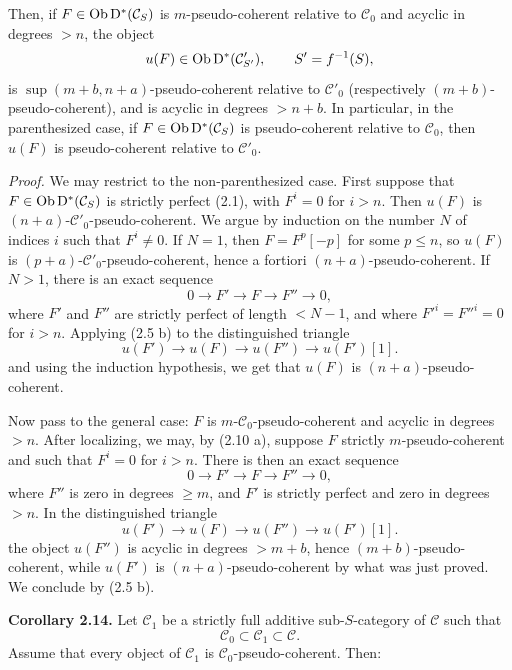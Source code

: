 \documentclass[11pt]{article}
\begin{document}
Then, if \(F\in\operatorname{Ob}\mathrm D^*(\mathcal C_S)\) is \(m\)-pseudo-coherent relative to \(\mathcal C_0\) and acyclic in degrees \(>n\), the object
\[
  u(F)\in\operatorname{Ob}\mathrm D^*(\mathcal C'_{S'}),\qquad S'=f^{-1}(S),
\]
is \(\sup(m+b,n+a)\)-pseudo-coherent relative to \(\mathcal C'_0\) (respectively \((m+b)\)-pseudo-coherent), and is acyclic in degrees \(>n+b\). In particular, in the parenthesized case, if \(F\in\operatorname{Ob}\mathrm D^*(\mathcal C_S)\) is pseudo-coherent relative to \(\mathcal C_0\), then \(u(F)\) is pseudo-coherent relative to \(\mathcal C'_0\).

\emph{Proof.} We may restrict to the non-parenthesized case. First suppose that \(F\in\operatorname{Ob}\mathrm D^*(\mathcal C_S)\) is strictly perfect (2.1), with \(F^i=0\) for \(i>n\). Then \(u(F)\) is \((n+a)\)-\(\mathcal C'_0\)-pseudo-coherent. We argue by induction on the number \(N\) of indices \(i\) such that \(F^i\neq0\). If \(N=1\), then \(F=F^p[-p]\) for some \(p\leq n\), so \(u(F)\) is \((p+a)\)-\(\mathcal C'_0\)-pseudo-coherent, hence a fortiori \((n+a)\)-pseudo-coherent. If \(N>1\), there is an exact sequence
\[
  0\longrightarrow F'\longrightarrow F\longrightarrow F''\longrightarrow 0,
\]
where \(F'\) and \(F''\) are strictly perfect of length \(<N-1\), and where \(F'^i=F''^i=0\) for \(i>n\). Applying (2.5 b) to the distinguished triangle
\[
  u(F')\longrightarrow u(F)\longrightarrow u(F'')\longrightarrow u(F')[1].
\]
and using the induction hypothesis, we get that \(u(F)\) is \((n+a)\)-pseudo-coherent.

Now pass to the general case: \(F\) is \(m\)-\(\mathcal C_0\)-pseudo-coherent and acyclic in degrees \(>n\). After localizing, we may, by (2.10 a), suppose \(F\) strictly \(m\)-pseudo-coherent and such that \(F^i=0\) for \(i>n\). There is then an exact sequence
\[
  0\longrightarrow F'\longrightarrow F\longrightarrow F''\longrightarrow 0,
\]
where \(F''\) is zero in degrees \(\geq m\), and \(F'\) is strictly perfect and zero in degrees \(>n\). In the distinguished triangle
\[
  u(F')\longrightarrow u(F)\longrightarrow u(F'')\longrightarrow u(F')[1].
\]
the object \(u(F'')\) is acyclic in degrees \(>m+b\), hence \((m+b)\)-pseudo-coherent, while \(u(F')\) is \((n+a)\)-pseudo-coherent by what was just proved. We conclude by (2.5 b).

\textbf{Corollary 2.14.} Let \(\mathcal C_1\) be a strictly full additive sub-\(S\)-category of \(\mathcal C\) such that
\[
  \mathcal C_0\subset \mathcal C_1\subset \mathcal C.
\]
Assume that every object of \(\mathcal C_1\) is \(\mathcal C_0\)-pseudo-coherent. Then:
\end{document}
